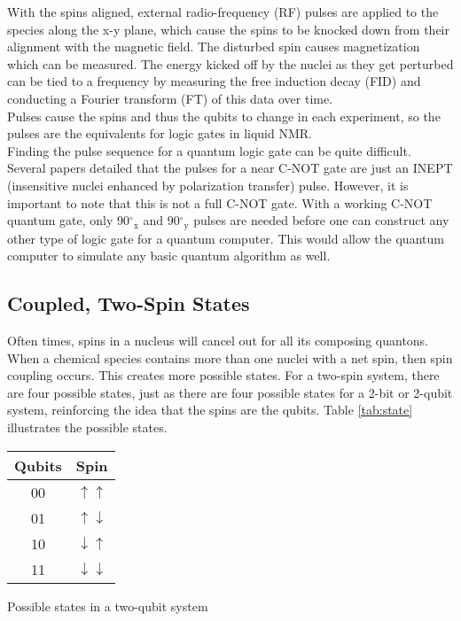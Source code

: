 \documentclass[11pt]{article}
\newcommand{\super}[1]{\ensuremath{^{\textrm{#1}}}}
\newcommand{\sub}[1]{\ensuremath{_{\textrm{#1}}}}
\begin{document}
\begin{multicols}{2}
With the spins aligned, external radio-frequency (RF) pulses are applied to the species along the x-y plane, which cause the spins to be knocked down from their alignment with the magnetic field. The disturbed spin causes magnetization which can be measured. The energy kicked off by the nuclei as they get perturbed can be tied to a frequency by measuring the free induction decay (FID) and conducting a Fourier transform (FT) of this data over time.\cite{nmr-roberts} \\

Pulses cause the spins and thus the qubits to change in each experiment, so the pulses are the equivalents for logic gates in liquid NMR. \\

Finding the pulse sequence for a quantum logic gate can be quite difficult. Several papers detailed that the pulses for a near C-NOT gate are just an INEPT (insensitive nuclei enhanced by polarization transfer) pulse.\cite{lnmr,gates} However, it is important to note that this is not a full C-NOT gate. With a working C-NOT quantum gate, only 90\super{$\circ$}\sub{x} and 90\super{$\circ$}\sub{y} pulses are needed before one can construct any other type of logic gate for a quantum computer\cite{gates}. This would allow the quantum computer to simulate any basic quantum algorithm as well.

  \subsection{Coupled, Two-Spin States}
  Often times, spins in a nucleus will cancel out for all its composing quantons. When a chemical species contains more than one nuclei with a net spin, then spin coupling occurs. This creates more possible states. For a two-spin system, there are four possible states, just as there are four possible states for a 2-bit or 2-qubit system, reinforcing the idea that the spins are the qubits. Table \ref{tab:state} illustrates the possible states.

\begin{ctable}
  \begin{center}
  \begin{tabular}{c | c}
    Qubits & Spin \\
    \hline
    00 & $\uparrow \uparrow$ \\
    01 & $\uparrow \downarrow$ \\
    10 & $\downarrow \uparrow$ \\
    11 & $\downarrow \downarrow$ \\
  \end{tabular}
  \end{center}
  \caption{Possible states in a two-qubit system}
  \label{tab:state}
\end{ctable}
\vspace{1em}


\end{multicols}
\end{document}
